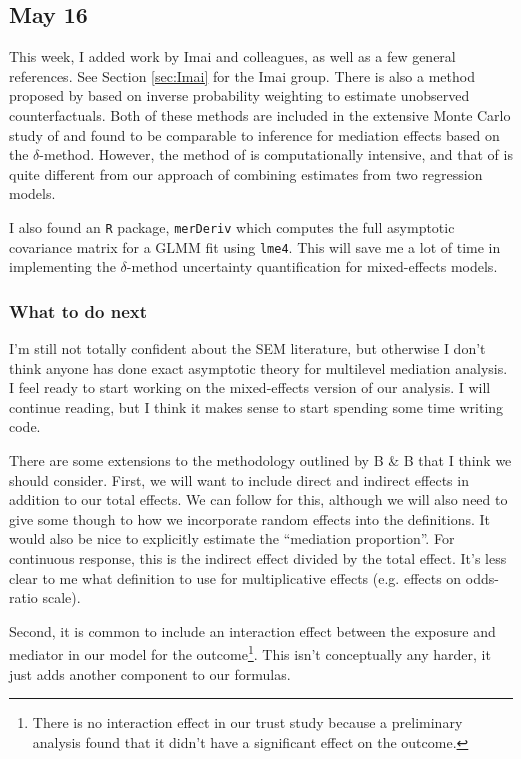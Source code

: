 \documentclass{report}
\begin{document}
\subsection{May 16}

This week, I added work by Imai and colleagues, as well as a few general references. See Section \ref{sec:Imai} for the Imai group. There is also a method proposed by \citet{Lan12} based on inverse probability weighting to estimate unobserved counterfactuals. Both of these methods are included in the extensive Monte Carlo study of \citet{Sam23} and found to be comparable to inference for mediation effects based on the $\delta$-method. However, the method of \citet{Ima10I} is computationally intensive, and that of \citet{Lan12} is quite different from our approach of combining estimates from two regression models.

I also found an \texttt{R} package, \texttt{merDeriv} \citep{Wan18} which computes the full asymptotic covariance matrix for a GLMM fit using \texttt{lme4}. This will save me a lot of time in implementing the $\delta$-method uncertainty quantification for mixed-effects models. 

\subsubsection{What to do next}

I'm still not totally confident about the SEM literature, but otherwise I don't think anyone has done exact asymptotic theory for multilevel mediation analysis. I feel ready to start working on the mixed-effects version of our analysis. I will continue reading, but I think it makes sense to start spending some time writing code.

There are some extensions to the methodology outlined by B \& B that I think we should consider. First, we will want to include direct and indirect effects in addition to our total effects. We can follow \citet{Sam23} for this, although we will also need to give some though to how we incorporate random effects into the definitions. It would also be nice to explicitly estimate the ``mediation proportion''. For continuous response, this is the indirect effect divided by the total effect. It's less clear to me what definition to use for multiplicative effects (e.g. effects on odds-ratio scale).

Second, it is common to include an interaction effect between the exposure and mediator in our model for the outcome\footnote{There is no interaction effect in our trust study because a preliminary analysis found that it didn't have a significant effect on the outcome.}. This isn't conceptually any harder, it just adds another component to our formulas. 
\end{document}
